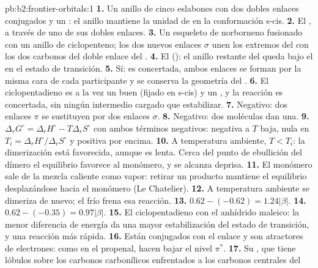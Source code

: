 \begin{solution}{pb:b2:frontier-orbitals:1}
\textbf{1.} Un anillo de cinco eslabones con dos dobles enlaces conjugados y un : el anillo
mantiene la unidad de  en la conformación s-cis.
\textbf{2.} El , a través de uno de sus dobles enlaces.
\textbf{3.} Un esqueleto de norborneno fusionado con un anillo de ciclopenteno; los dos nuevos enlaces $\sigma$ unen
los extremos del  con los dos carbonos del doble enlace del .
\textbf{4.} El  (): el anillo restante del  queda bajo
el  en el estado de transición.
\textbf{5.} Sí: es concertada, ambos enlaces se forman por la misma cara de cada participante y
se conserva la geometría del .
\textbf{6.} El ciclopentadieno es a la vez un buen  (fijado en s-cis) y un , y la
reacción es concertada, sin ningún intermedio cargado que estabilizar.
\textbf{7.} Negativo: dos enlaces $\pi$ se sustituyen por dos enlaces $\sigma$.
\textbf{8.} Negativo: dos moléculas dan una.
\textbf{9.} $\Delta_r G^\circ = \Delta_r H^\circ - T\Delta_r S^\circ$ con ambos términos negativos: negativa a
$T$ baja, nula en $T_i = \Delta_r H^\circ/\Delta_r S^\circ$ y positiva por encima.
\textbf{10.} A temperatura ambiente, $T < T_i$: la dimerización está favorecida, aunque es lenta. Cerca
del punto de ebullición del dímero el equilibrio favorece al monómero, y se alcanza
deprisa.
\textbf{11.} El monómero sale de la mezcla caliente como vapor: retirar un producto mantiene
el equilibrio desplazándose hacia el monómero (Le Chatelier).
\textbf{12.} A temperatura ambiente se dimeriza de nuevo; el frío frena esa reacción.
\textbf{13.} $0.62 - (-0.62) = 1.24|\beta|$.
\textbf{14.} $0.62 - (-0.35) = 0.97|\beta|$.
\textbf{15.} El ciclopentadieno con el anhídrido maleico: la menor diferencia de energía da una mayor
estabilización del estado de transición, y una reacción más rápida.
\textbf{16.} Están conjugados con el enlace  y son atractores de electrones: como en el
propenal, hacen bajar el nivel $\pi^*$.
\textbf{17.} Su , que tiene lóbulos sobre los carbonos carbonílicos enfrentados a los carbonos centrales del

\end{solution}
